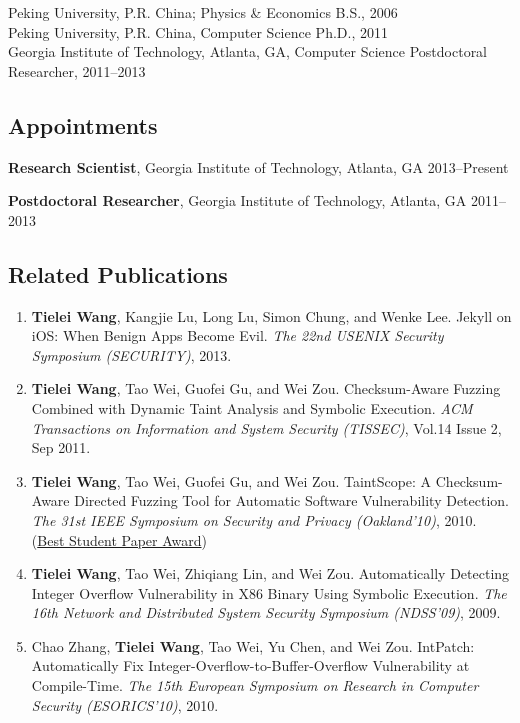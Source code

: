 \documentclass[letterpaper,twoside,11pt,headings=small]{scrartcl}
\begin{document}
\noindent Peking University, P.R. China; Physics \& Economics \hfill B.S., 2006 \\

\noindent Peking University, P.R. China, Computer Science \hfill Ph.D., 2011 \\

\noindent Georgia Institute of Technology, Atlanta, GA, Computer Science \hfill Postdoctoral Researcher, 2011--2013

\subsection*{Appointments}

\noindent \textbf{Research Scientist}, Georgia Institute of Technology, Atlanta, GA \hfill 2013--Present

\noindent \textbf{Postdoctoral Researcher}, Georgia Institute of Technology, Atlanta, GA \hfill 2011--2013

\subsection*{Related Publications}

\begin{enumerate}

    \item \textbf{Tielei Wang}, Kangjie Lu, Long Lu, Simon Chung, and Wenke Lee. Jekyll on iOS: When Benign Apps Become Evil. \emph{The 22nd USENIX Security Symposium (SECURITY)}, 2013.

    \item \textbf{Tielei Wang}, Tao Wei, Guofei Gu, and Wei Zou. Checksum-Aware Fuzzing Combined with Dynamic Taint Analysis and Symbolic Execution. \emph{ACM Transactions on Information and System Security (TISSEC)}, Vol.14 Issue 2, Sep 2011.

    \item  \textbf{Tielei Wang}, Tao Wei, Guofei Gu, and Wei Zou. TaintScope: A Checksum-Aware Directed Fuzzing Tool for Automatic Software Vulnerability Detection. \emph{The 31st IEEE Symposium on Security and Privacy (Oakland'10)},  2010. (\underline{Best Student Paper Award})

    \item \textbf{Tielei Wang}, Tao Wei, Zhiqiang Lin, and Wei Zou. Automatically Detecting Integer Overflow Vulnerability in X86 Binary Using Symbolic Execution. \emph{The 16th Network and
Distributed System Security Symposium (NDSS'09)}, 2009.

    \item Chao Zhang, \textbf{Tielei Wang}, Tao Wei, Yu Chen, and Wei Zou. IntPatch: Automatically Fix Integer-Overflow-to-Buffer-Overflow Vulnerability at Compile-Time. \emph{The 15th European Symposium on Research in Computer Security (ESORICS'10)}, 2010.

\end{enumerate}
\end{document}
